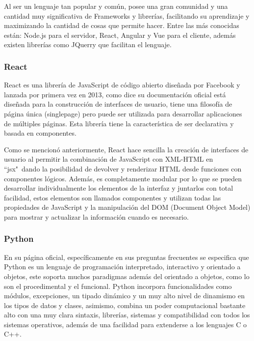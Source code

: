 Al ser un lenguaje tan popular y común, posee una gran comunidad y una cantidad
muy significativa de Frameworks  y librerías, facilitando su aprendizaje
y maximizando la cantidad de cosas que permite hacer. Entre las más conocidas
están: Node.js para el servidor, React, Angular y Vue para el cliente, además
existen librerías como JQuerry que facilitan el lenguaje.

\subsubsection{React}

React es una librería de JavaScript de código abierto diseñada por Facebook y
lanzada por primera vez en 2013, como dice su documentación oficial \textcite{React}
está diseñada para la construcción de interfaces de usuario, tiene una filosofía
de página única (singlepage) pero puede ser utilizada para desarrollar aplicaciones
de múltiples páginas. Esta librería tiene la característica de ser declarativa
y basada en componentes.

Como se mencionó anteriormente, React hace sencilla la creación de interfaces
de usuario al permitir la combinación de JavaScript con XML-HTML en ``jsx"\  dando
la posibilidad de devolver y renderizar HTML desde funciones con componentes
lógicos. Además, es completamente modular por lo que se pueden desarrollar
individualmente los elementos de la interfaz y juntarlos con total facilidad,
estos elementos son llamados componentes y utilizan todas las propiedades de
JavaScript y la manipulación del DOM (Document Object Model) para mostrar
y actualizar la información cuando es necesario.


\subsubsection{Python}

En su página oficial, específicamente en sus preguntas frecuentes
\textcite{pythonDocs} se especifica que Python es un lenguaje de programación
interpretado, interactivo y orientado a objetos, este soporta muchos paradigmas
además del orientado a objetos, como lo son el procedimental y el funcional.
Python incorpora funcionalidades como módulos, excepciones, un tipado dinámico
y un muy alto nivel de dinamismo en los tipos de datos y clases, asimismo,
combina un poder computacional bastante alto con una muy clara sintaxis,
librerías, sistemas y compatibilidad con todos los sistemas operativos, además
de una facilidad para extenderse a los lenguajes C o C++.

